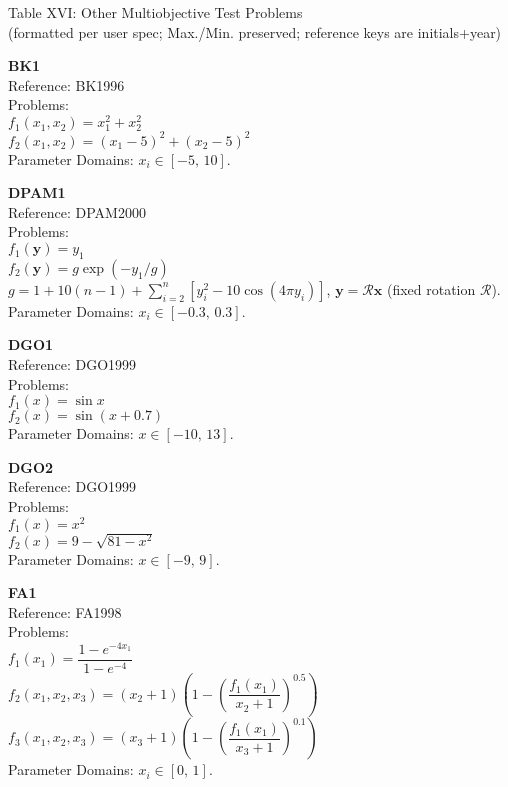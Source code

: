\documentclass[12pt,a4paper]{article}
\begin{document}
\begin{center}
{\LARGE Table XVI: Other Multiobjective Test Problems}\\[0.25em]
{\large (formatted per user spec; Max./Min. preserved; reference keys are initials+year)}\\
\end{center}


\textbf{BK1}\\
Reference: BK1996\\
Problems:\\
$f_1(x_1,x_2) = x_1^2 + x_2^2$\\
$f_2(x_1,x_2) = (x_1 - 5)^2 + (x_2 - 5)^2$\\
Parameter Domains: $x_i \in [-5,\,10]$.

\medskip

\textbf{DPAM1}\\
Reference: DPAM2000\\
Problems:\\
$f_1(\mathbf{y}) = y_1$\\
$f_2(\mathbf{y}) = g \exp(-y_1/g)$\\
$g = 1 + 10(n-1) + \sum_{i=2}^{n}\!\left[y_i^2 - 10\cos(4\pi y_i)\right]$, \quad $\mathbf{y}=\mathcal{R}\mathbf{x}$ (fixed rotation $\mathcal{R}$).\\
Parameter Domains: $x_i \in [-0.3,\,0.3]$.

\medskip

\textbf{DGO1}\\
Reference: DGO1999\\
Problems:\\
$f_1(x) = \sin x$\\
$f_2(x) = \sin(x+0.7)$\\
Parameter Domains: $x \in [-10,\,13]$.

\medskip

\textbf{DGO2}\\
Reference: DGO1999\\
Problems:\\
$f_1(x) = x^2$\\
$f_2(x) = 9 - \sqrt{81 - x^2}$\\
Parameter Domains: $x \in [-9,\,9]$.

\medskip

\textbf{FA1}\\
Reference: FA1998\\
Problems:\\
$f_1(x_1) = \dfrac{1 - e^{-4x_1}}{1 - e^{-4}}$\\
$f_2(x_1,x_2,x_3) = (x_2+1)\!\left(1 - \left(\dfrac{f_1(x_1)}{x_2+1}\right)^{0.5}\right)$\\
$f_3(x_1,x_2,x_3) = (x_3+1)\!\left(1 - \left(\dfrac{f_1(x_1)}{x_3+1}\right)^{0.1}\right)$\\
Parameter Domains: $x_i \in [0,\,1]$.
\end{document}

